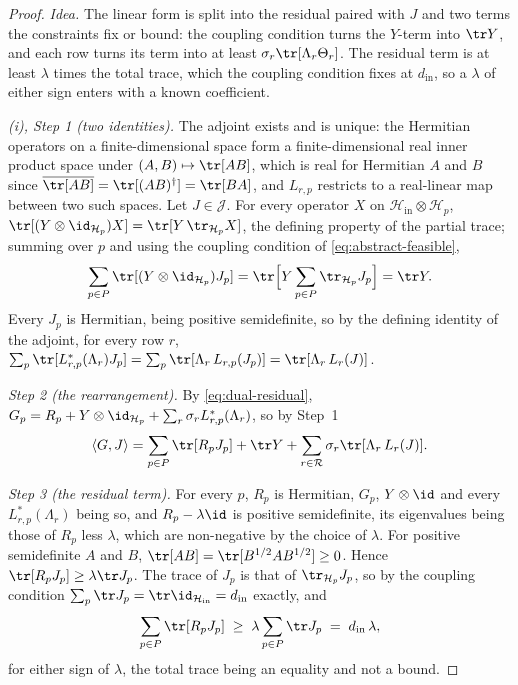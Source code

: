 \begin{proof}
\emph{Idea.} The linear form is split into the residual paired with $J$ and
two terms the constraints fix or bound: the coupling condition turns the
$Y$-term into $\tr Y$, and each row turns its term into at least
$\sigma_r\tr[\Lambda_r\Theta_r]$. The residual term is at least $\lambda$
times the total trace, which the coupling condition fixes at
$d_{\mathrm{in}}$, so a $\lambda$ of either sign enters with a known
coefficient.

\emph{(i), Step 1 (two identities).} The adjoint exists and is unique: the
Hermitian operators on a finite-dimensional space form a finite-dimensional
real inner product space under $(A,B)\mapsto\tr[AB]$, which is real for
Hermitian $A$ and $B$ since $\overline{\tr[AB]}=\tr[(AB)^{\dagger}]=\tr[BA]$,
and $L_{r,p}$ restricts to a real-linear map between two such spaces. Let
$J\in\mathcal{J}$. For every operator $X$ on
$\mathcal{H}_{\mathrm{in}}\otimes\mathcal{H}_p$,
$\tr[(Y\otimes\id_{\mathcal{H}_p})X]=\tr[Y\,\tr_{\mathcal{H}_p}X]$, the
defining property of the partial trace; summing over $p$ and using the
coupling condition of \eqref{eq:abstract-feasible},
\begin{equation*}
  \sum_{p\in P}\tr[(Y\otimes\id_{\mathcal{H}_p})J_p]
  =\tr\Big[Y\sum_{p\in P}\tr_{\mathcal{H}_p}J_p\Big]=\tr Y .
\end{equation*}
Every $J_p$ is Hermitian, being positive semidefinite, so by the defining
identity of the adjoint, for every row $r$,
$\sum_p\tr[L^{*}_{r,p}(\Lambda_r)J_p]=\sum_p\tr[\Lambda_r\,L_{r,p}(J_p)]
=\tr[\Lambda_r\,L_r(J)]$.

\emph{Step 2 (the rearrangement).} By \eqref{eq:dual-residual},
$G_p=R_p+Y\otimes\id_{\mathcal{H}_p}+\sum_r\sigma_rL^{*}_{r,p}(\Lambda_r)$,
so by Step~1
\begin{equation*}
  \langle G,J\rangle=\sum_{p\in P}\tr[R_pJ_p]+\tr Y
  +\sum_{r\in\mathcal{R}}\sigma_r\tr[\Lambda_r\,L_r(J)] .
\end{equation*}

\emph{Step 3 (the residual term).} For every $p$, $R_p$ is Hermitian, $G_p$,
$Y\otimes\id$ and every $L^{*}_{r,p}(\Lambda_r)$ being so, and
$R_p-\lambda\id$ is positive semidefinite, its eigenvalues being those of
$R_p$ less $\lambda$, which are non-negative by the choice of $\lambda$. For
positive semidefinite $A$ and $B$, $\tr[AB]=\tr[B^{1/2}AB^{1/2}]\ge0$. Hence
$\tr[R_pJ_p]\ge\lambda\tr J_p$. The trace of $J_p$ is that of
$\tr_{\mathcal{H}_p}J_p$, so by the coupling condition
$\sum_p\tr J_p=\tr\id_{\mathcal{H}_{\mathrm{in}}}=d_{\mathrm{in}}$ exactly,
and
\begin{equation*}
  \sum_{p\in P}\tr[R_pJ_p]\;\ge\;\lambda\sum_{p\in P}\tr J_p
  \;=\;d_{\mathrm{in}}\,\lambda ,
\end{equation*}
for either sign of $\lambda$, the total trace being an equality and not a
bound.


\end{proof}
